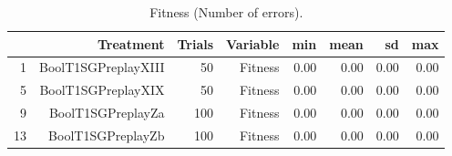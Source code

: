 \begin{table}[ht]
\centering
\begin{tabular}{rrrrrrrr}
  \hline
 & Treatment & Trials & Variable & min & mean & sd & max \\ 
  \hline
1 & BoolT1SGPreplayXIII &  50 & Fitness & 0.00 & 0.00 & 0.00 & 0.00 \\ 
  5 & BoolT1SGPreplayXIX &  50 & Fitness & 0.00 & 0.00 & 0.00 & 0.00 \\ 
  9 & BoolT1SGPreplayZa & 100 & Fitness & 0.00 & 0.00 & 0.00 & 0.00 \\ 
  13 & BoolT1SGPreplayZb & 100 & Fitness & 0.00 & 0.00 & 0.00 & 0.00 \\ 
   \hline
\end{tabular}
\caption{Fitness (Number of errors).} 
\end{table}
